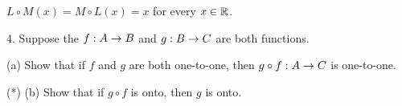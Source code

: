 \documentclass[12pt]{article}
\begin{document}
\begin{description}
\vspace{-.07in}

\hspace{.3in} $L\circ M(x) = M\circ L(x) = x$ 
for every $x\in{\mathbb R}$.

\msk

\item{4.} Suppose the $f:A\rightarrow B$ and $g:B\rightarrow C$
are both functions.

\ssk

\item{\spc} (a) Show that if $f$ and $g$ are both one-to-one, 
then $g\circ f:A\rightarrow C$ is one-to-one.

\ssk

\item{(*)} (b) Show that if $g\circ f$ is onto, then $g$ is onto.

\end{description}
\vfill
\end{document}
